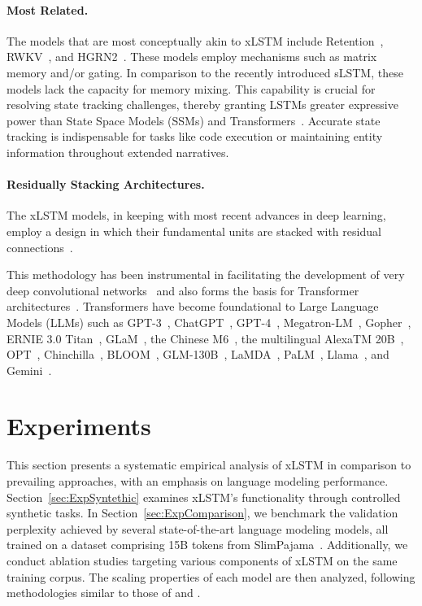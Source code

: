 \paragraph{Most Related.} The models that are most conceptually akin to xLSTM include Retention~\citep{Sun:23arxiv}, RWKV~\citep{Peng:23arxivshort,Peng:24arxivshort}, and HGRN2~\citep{Qin:24arxiv}. These models employ mechanisms such as matrix memory and/or gating. In comparison to the recently introduced sLSTM, these models lack the capacity for memory mixing. This capability is crucial for resolving state tracking challenges, thereby granting LSTMs greater expressive power than State Space Models (SSMs) and Transformers~\citep{Merrill:24,Deletang:23}. Accurate state tracking is indispensable for tasks like code execution or maintaining entity information throughout extended narratives.

\paragraph{Residually Stacking Architectures.} The xLSTM models, in keeping with most recent advances in deep learning, employ a design in which their fundamental units are stacked with residual connections~\citep{Srivastava:15,He:16}.

This methodology has been instrumental in facilitating the development of very deep convolutional networks~\citep{He:16} and also forms the basis for Transformer architectures~\citep{Vaswani:17}. Transformers have become foundational to Large Language Models (LLMs) such as GPT-3~\citep{Brown:20short}, ChatGPT~\citep{Schulman:22short}, GPT-4~\citep{Achiam:23gpt4short}, Megatron-LM~\citep{Shoeybi:19}, Gopher~\citep{Rae:21short}, ERNIE 3.0 Titan~\citep{Wang:21arxivshort}, GLaM~\citep{Du:21glamshort}, the Chinese M6~\citep{Lin:21}, the multilingual AlexaTM 20B~\citep{Soltan:22}, OPT~\citep{Zhang:22opt}, Chinchilla~\citep{Hoffmann:22short}, BLOOM~\citep{Scao:22arxivshort}, GLM-130B~\citep{Zeng:22arxivshort}, LaMDA~\citep{Thoppilan:22short}, PaLM~\citep{Chowdhery:22short}, Llama~\citep{Touvron:23arxiv}, and Gemini~\citep{GeminiTeam:23arxiv,Reid:24arxiv}.

\section{Experiments}
\label{sec:Exp}

This section presents a systematic empirical analysis of xLSTM in comparison to prevailing approaches, with an emphasis on language modeling performance. Section~\ref{sec:ExpSyntethic} examines xLSTM's functionality through controlled synthetic tasks. In Section~\ref{sec:ExpComparison}, we benchmark the validation perplexity achieved by several state-of-the-art language modeling models, all trained on a dataset comprising 15B tokens from SlimPajama~\citep{Soboleva:23}. Additionally, we conduct ablation studies targeting various components of xLSTM on the same training corpus. The scaling properties of each model are then analyzed, following methodologies similar to those of \citet{Kaplan:20} and \citet{Brown:20short}.


